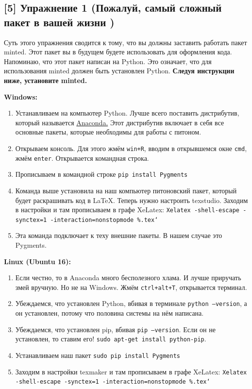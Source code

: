 \documentclass[12pt, a4paper, oneside]{article}
\begin{document}
	
	
	\subsection*{[5]   Упражнение 1 (Пожалуй, самый сложный пакет в вашей жизни ) }
	
	Суть этого упражнения сводится к тому, что вы должны заставить работать пакет minted.  Этот пакет вы в будущем будете использовать для оформления кода.  Напоминаю, что этот пакет написан на Python. Это означает, что для использования minted должен быть установлен Python. \textbf{Следуя инструкции ниже, установите minted.} 
	
	\textbf{Windows:}
	
	\begin{enumerate}
		\item Устанавливаем на компьютер Python. Лучше всего поставить дистрибутив, который называется \href{https://docs.continuum.io/anaconda/install}{Anaconda.} Этот дистрибутив включает в себя все основные пакеты, которые необходимы для работы с питоном. 
		
		\item Открываем консоль. Для этого жмём \texttt{win+R}, вводим в открывшемся окне \texttt{cmd}, жмём \texttt{enter}.  Открывается командная строка. 
		
		\item Прописываем в командной строке \texttt{pip install Pygments}
		
		\item Команда выше установила на наш компьютер питоновский пакет, который будет раскрашивать код в \LaTeX{}. Теперь нужно настроить texstudio. Заходим в настройки и там прописываем в графе  XeLatex: \newline  \texttt{Xelatex -shell-escape -synctex=1 -interaction=nonstopmode \%.tex`}
		
		\item Эта команда подключает к теху внешние пакеты. В нашем случае это Pygments. 
	\end{enumerate} 
	
	
	\textbf{Linux (Ubuntu 16):}
	
	\begin{enumerate}
		\item Если честно, то в Anaconda много бесполезного хлама. И лучше приручать змей вручную. Но не на Windows. Жмём \texttt{ctrl+alt+T}, открывается терминал. 
		\item Убеждаемся, что установлен Python, вбивая в терминале \texttt{python --version}, а он установлен, потому что половина системы на нём написана.
		\item Убеждаемся, что установлен pip, вбивая  \texttt{pip --version}. Если он не установлен, то ставим его!  \texttt{sudo apt-get install python-pip}.
		\item Устанавливаем наш пакет  \texttt{sudo pip install Pygments}
		\item Заходим в настройки texmaker и там прописываем в графе  XeLatex:  \newline \texttt{Xelatex -shell-escape -synctex=1 -interaction=nonstopmode \%.tex`}
	\end{enumerate} 
	
\end{document}
